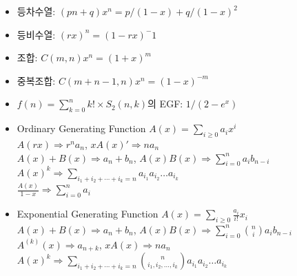 \begin{itemize}[noitemsep]
    \item 등차수열: $(pn + q)x^n = p / (1-x) + q / (1-x)^2$
    \item 등비수열: $(rx)^n = (1 - rx)^-1$
    \item 조합: $C(m, n)x^n = (1+x)^m$
    \item 중복조합: $C(m+n-1, n)x^n = (1-x)^{-m}$
    \item $f(n)=\sum_{k=0}^{n} k! \times S_2(n, k)$의 EGF: $1 / (2-e^x)$
    \item Ordinary Generating Function $A(x) = \sum_{i\ge 0} a_ix^i$\\
        $A(rx)             \Rightarrow r^na_n$,
        $xA(x)'            \Rightarrow na_n$\\
        $A(x) + B(x)       \Rightarrow a_n + b_n$,
        $A(x)B(x)          \Rightarrow \sum_{i=0}^{n} a_ib_{n-i}$\\
        $A(x)^k            \Rightarrow \sum_{i_1+i_2+\cdots+i_k=n} a_{i_1}a_{i_2}\ldots a_{i_k}$\\
        $\frac{A(x)}{1-x}  \Rightarrow \sum_{i=0}^{n} a_i$
    \item Exponential Generating Function $A(x) = \sum_{i\ge 0} \frac{a_i}{i!}x_i$\\
        $A(x) + B(x)       \Rightarrow a_n + b_n$,
        $A(x)B(x)          \Rightarrow \sum_{i=0}^{n} \binom{n}{i}a_ib_{n-i}$\\
        $A^{(k)}(x)        \Rightarrow a_{n+k}$,
        $xA(x)             \Rightarrow na_n$\\
        $A(x)^k            \Rightarrow \sum_{i_1+i_2+\cdots+i_k=n} \binom{n}{i_1, i_2, \ldots, i_k}a_{i_1}a_{i_2}\ldots a_{i_k}$
\end{itemize}